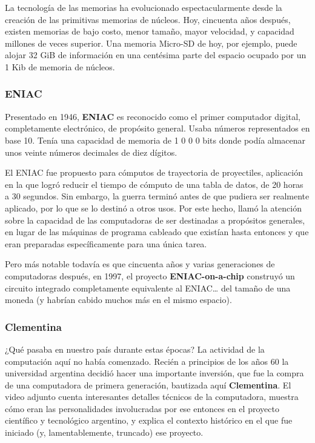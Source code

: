 \documentclass[spanish,A4,]{article}
\begin{document}
La tecnología de las memorias ha evolucionado espectacularmente desde la
creación de las primitivas memorias de núcleos. Hoy, cincuenta años
después, existen memorias de bajo costo, menor tamaño, mayor velocidad,
y capacidad millones de veces superior. Una memoria Micro-SD de hoy, por
ejemplo, puede alojar 32 GiB de información en una centésima parte del
espacio ocupado por un 1 Kib de memoria de núcleos.

\subsubsection{ENIAC}\label{eniac}

Presentado en 1946, \textbf{ENIAC} es reconocido como el primer
computador digital, completamente electrónico, de propósito general.
Usaba números representados en base 10. Tenía una capacidad de memoria
de 1 0 0 0 bits donde podía almacenar unos veinte números decimales de diez
dígitos.

El ENIAC fue propuesto para cómputos de trayectoria de proyectiles,
aplicación en la que logró reducir el tiempo de cómputo de una tabla de
datos, de 20 horas a 30 segundos. Sin embargo, la guerra terminó antes
de que pudiera ser realmente aplicado, por lo que se lo destinó a otros
usos. Por este hecho, llamó la atención sobre la capacidad de las
computadoras de ser destinadas a propósitos generales, en lugar de las
máquinas de programa cableado que existían hasta entonces y que eran
preparadas específicamente para una única tarea.

Pero más notable todavía es que cincuenta años y varias generaciones de
computadoras después, en 1997, el proyecto \textbf{ENIAC-on-a-chip}
construyó un circuito integrado completamente equivalente al
ENIAC\ldots{} del tamaño de una moneda (y habrían cabido muchos más en
el mismo espacio).

\subsubsection{Clementina}\label{clementina}

¿Qué pasaba en nuestro país durante estas épocas? La actividad de la
computación aquí no había comenzado. Recién a principios de los años 60
la universidad argentina decidió hacer una importante inversión, que fue
la compra de una computadora de primera generación, bautizada aquí
\textbf{Clementina}. El video adjunto cuenta interesantes detalles
técnicos de la computadora, muestra cómo eran las personalidades
involucradas por ese entonces en el proyecto científico y tecnológico
argentino, y explica el contexto histórico en el que fue iniciado (y,
lamentablemente, truncado) ese proyecto.
\end{document}
